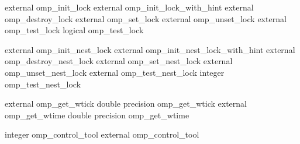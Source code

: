 {\begin{codepar}
     external omp\_init\_lock
     external omp\_init\_lock\_with\_hint
     external omp\_destroy\_lock
     external omp\_set\_lock
     external omp\_unset\_lock
     external omp\_test\_lock
     logical omp\_test\_lock

     external omp\_init\_nest\_lock
     external omp\_init\_nest\_lock\_with\_hint
     external omp\_destroy\_nest\_lock
     external omp\_set\_nest\_lock
     external omp\_unset\_nest\_lock
     external omp\_test\_nest\_lock
     integer omp\_test\_nest\_lock

     external omp\_get\_wtick
     double precision omp\_get\_wtick
     external omp\_get\_wtime
     double precision omp\_get\_wtime

     integer  omp\_control\_tool
     external omp\_control\_tool
\end{codepar}}





\pagebreak
